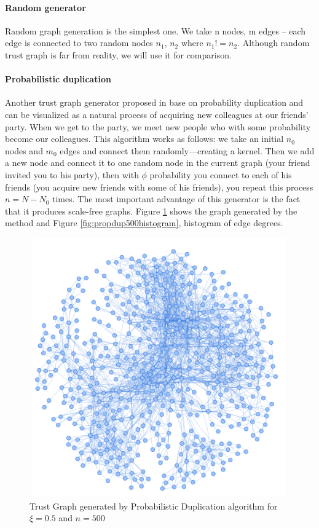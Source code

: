 \documentclass[nostrict]{szablonPG}
\begin{document}
\paragraph{Random generator}
Random graph generation is the simplest one. We take n nodes, m edges -- each edge is connected to two random nodes $n_1$, $n_2$ where $n_1 != n_2$. Although random trust graph is far from reality, we will use it for comparison.

\paragraph{Probabilistic duplication}
Another trust graph generator proposed in \cite{konorski2019mitigating} base on probability duplication and can be visualized as a natural process of acquiring new colleagues at our friends' party. When we get to the party, we meet new people who with some probability become our colleagues. This algorithm works as follows: we take an initial $n_0$ nodes and $m_0$ edges and connect them randomly---creating a kernel. Then we add a new node and connect it to one random node in the current graph (your friend invited you to his party), then with $\phi$ probability you connect to each of his friends (you acquire new friends with some of his friends), you repeat this process $n = N - N_0$ times. 
The most important advantage of this generator is the fact that it produces scale-free graphs. Figure \ref{fig:propdup500graph} shows the graph generated by the method and Figure \ref{fig:propdup500histogram}, histogram of edge degrees.

\begin{figure}[h!]
    \includegraphics[width=11cm]{img/propDup500Graph.png}
    \centering
    \caption{Trust Graph generated by Probabilistic Duplication algorithm for $\xi=0.5$ and $n = 500$}
    \label{fig:propdup500graph}
\end{figure}
\end{document}
